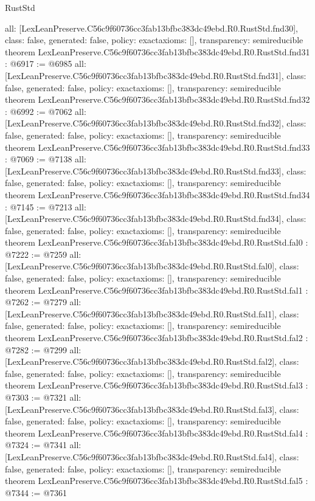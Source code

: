 \begin{lexlean}{RustStd}
\begin{coremodule}
{  all: [LexLeanPreserve.C56c9f60736cc3fab13bfbc383dc49ebd.R0.RustStd.fnd30],
  class: false,
  generated: false,
  policy: exact{axioms: []},
  transparency: semireducible
}
theorem LexLeanPreserve.C56c9f60736cc3fab13bfbc383dc49ebd.R0.RustStd.fnd31 : @6917 := @6985 {
  all: [LexLeanPreserve.C56c9f60736cc3fab13bfbc383dc49ebd.R0.RustStd.fnd31],
  class: false,
  generated: false,
  policy: exact{axioms: []},
  transparency: semireducible
}
theorem LexLeanPreserve.C56c9f60736cc3fab13bfbc383dc49ebd.R0.RustStd.fnd32 : @6992 := @7062 {
  all: [LexLeanPreserve.C56c9f60736cc3fab13bfbc383dc49ebd.R0.RustStd.fnd32],
  class: false,
  generated: false,
  policy: exact{axioms: []},
  transparency: semireducible
}
theorem LexLeanPreserve.C56c9f60736cc3fab13bfbc383dc49ebd.R0.RustStd.fnd33 : @7069 := @7138 {
  all: [LexLeanPreserve.C56c9f60736cc3fab13bfbc383dc49ebd.R0.RustStd.fnd33],
  class: false,
  generated: false,
  policy: exact{axioms: []},
  transparency: semireducible
}
theorem LexLeanPreserve.C56c9f60736cc3fab13bfbc383dc49ebd.R0.RustStd.fnd34 : @7145 := @7213 {
  all: [LexLeanPreserve.C56c9f60736cc3fab13bfbc383dc49ebd.R0.RustStd.fnd34],
  class: false,
  generated: false,
  policy: exact{axioms: []},
  transparency: semireducible
}
theorem LexLeanPreserve.C56c9f60736cc3fab13bfbc383dc49ebd.R0.RustStd.fal0 : @7222 := @7259 {
  all: [LexLeanPreserve.C56c9f60736cc3fab13bfbc383dc49ebd.R0.RustStd.fal0],
  class: false,
  generated: false,
  policy: exact{axioms: []},
  transparency: semireducible
}
theorem LexLeanPreserve.C56c9f60736cc3fab13bfbc383dc49ebd.R0.RustStd.fal1 : @7262 := @7279 {
  all: [LexLeanPreserve.C56c9f60736cc3fab13bfbc383dc49ebd.R0.RustStd.fal1],
  class: false,
  generated: false,
  policy: exact{axioms: []},
  transparency: semireducible
}
theorem LexLeanPreserve.C56c9f60736cc3fab13bfbc383dc49ebd.R0.RustStd.fal2 : @7282 := @7299 {
  all: [LexLeanPreserve.C56c9f60736cc3fab13bfbc383dc49ebd.R0.RustStd.fal2],
  class: false,
  generated: false,
  policy: exact{axioms: []},
  transparency: semireducible
}
theorem LexLeanPreserve.C56c9f60736cc3fab13bfbc383dc49ebd.R0.RustStd.fal3 : @7303 := @7321 {
  all: [LexLeanPreserve.C56c9f60736cc3fab13bfbc383dc49ebd.R0.RustStd.fal3],
  class: false,
  generated: false,
  policy: exact{axioms: []},
  transparency: semireducible
}
theorem LexLeanPreserve.C56c9f60736cc3fab13bfbc383dc49ebd.R0.RustStd.fal4 : @7324 := @7341 {
  all: [LexLeanPreserve.C56c9f60736cc3fab13bfbc383dc49ebd.R0.RustStd.fal4],
  class: false,
  generated: false,
  policy: exact{axioms: []},
  transparency: semireducible
}
theorem LexLeanPreserve.C56c9f60736cc3fab13bfbc383dc49ebd.R0.RustStd.fal5 : @7344 := @7361 {
}
\end{coremodule}
\end{lexlean}
